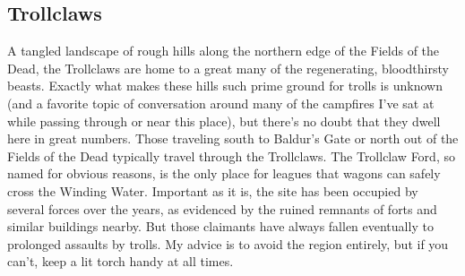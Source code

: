 \documentclass[10pt,a4paper,twoside,twocolumn,openany,bg=print,nodeprecatedcode]{dndbook}
\begin{document}
\subsection{Trollclaws}
A tangled landscape of rough hills along the northern edge of the Fields of the Dead, the Trollclaws are home to a great many of the regenerating, bloodthirsty beasts. Exactly what makes these hills such prime ground for trolls is unknown (and a favorite topic of conversation around many of the campfires I've sat at while passing through or near this place), but there's no doubt that they dwell here in great numbers.
Those traveling south to Baldur's Gate or north out of the Fields of the Dead typically travel through the Trollclaws. The Trollclaw Ford, so named for obvious reasons, is the only place for leagues that wagons can safely cross the Winding Water. Important as it is, the site has been occupied by several forces over the years, as evidenced by the ruined remnants of forts and similar buildings nearby. But those claimants have always fallen eventually to prolonged assaults by trolls. My advice is to avoid the region entirely, but if you can't, keep a lit torch handy at all times.
\end{document}
